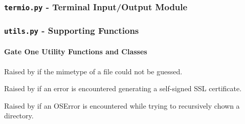 \documentclass[letterpaper,10pt,openany]{sphinxmanual}
\begin{document}
\subsubsection{\texttt{termio.py} - Terminal Input/Output Module}
\label{Developer/termio:termio-py-terminal-input-output-module}\label{Developer/termio::doc}\label{Developer/termio:module-termio}

\subsubsection{\texttt{utils.py} - Supporting Functions}
\label{Developer/utils:utils-py-supporting-functions}\label{Developer/utils:module-gateone.core.utils}\label{Developer/utils::doc}

\paragraph{Gate One Utility Functions and Classes}
\label{Developer/utils:utils-py}\label{Developer/utils:gate-one-utility-functions-and-classes}

\begin{fulllineitems}
\label{Developer/utils:gateone.core.utils.MimeTypeFail}
Raised by {\hyperref[Developer/utils:gateone.core.utils.create_data_uri]{}} if the mimetype of a file could not be guessed.

\end{fulllineitems}


\begin{fulllineitems}
\label{Developer/utils:gateone.core.utils.SSLGenerationError}
Raised by {\hyperref[Developer/utils:gateone.core.utils.gen_self_signed_ssl]{}} if an error is encountered generating a
self-signed SSL certificate.

\end{fulllineitems}


\begin{fulllineitems}
\label{Developer/utils:gateone.core.utils.ChownError}
Raised by {\hyperref[Developer/utils:gateone.core.utils.recursive_chown]{}} if an OSError is encountered while trying to
recursively chown a directory.

\end{fulllineitems}
\end{document}

